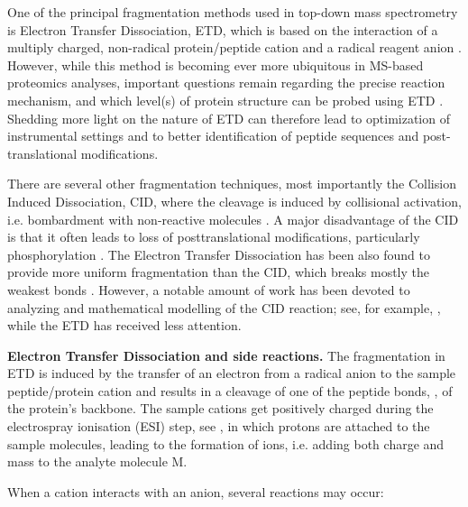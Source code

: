 \documentclass{llncs}
\begin{document}
        One of the principal fragmentation methods used in top-down mass spectrometry is Electron Transfer Dissociation, ETD, which is based on the interaction of a multiply charged, non-radical protein/peptide cation and a radical reagent anion \cite{Syka2004-rg,Zhurov2013-ua}. However, while this method is becoming ever more ubiquitous in MS-based proteomics analyses, important questions remain regarding the precise reaction mechanism, and which level(s) of protein structure can be probed using ETD \cite{Sohn2009-zv,Sohn2015-rp}. Shedding more light on the nature of ETD can therefore lead to optimization of instrumental settings and to better identification of peptide sequences and post-translational modifications.

        There are several other fragmentation techniques, most importantly the Collision Induced Dissociation, CID, where the cleavage is induced by collisional activation, i.e. bombardment with non-reactive molecules \cite{Mitchell_Wells2005-gn}. A major disadvantage of the CID is that it often leads to loss of posttranslational modifications, particularly phosphorylation \cite{Kim2012-yz}. The Electron Transfer Dissociation has been also found to provide more uniform fragmentation than the CID, which breaks mostly the weakest bonds \cite{Kim2012-yz,Zhurov2013-ua}. However, a notable amount of work has been devoted to analyzing and mathematical modelling of the CID reaction; see, for example, \cite{Zhang2004-fp,Zhang2005-jn,Wysocki2000-am}, while the ETD has received less attention.

\textbf{Electron Transfer Dissociation and side reactions.}
        The fragmentation in ETD is induced by the transfer of an electron from a radical anion to the sample peptide/protein cation and results in a cleavage of one of the peptide bonds, , of the protein’s backbone. The sample cations get positively charged during the electrospray ionisation (ESI) step, see \cite{Fenn1989-mp}, in which protons are attached to the sample molecules, leading to the formation of  ions, i.e. adding both charge and mass to the analyte molecule M.

        When a cation interacts with an anion, several reactions may occur:
\end{document}
